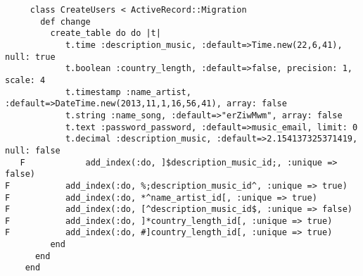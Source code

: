 	\begin{verbatim}
   	 class CreateUsers < ActiveRecord::Migration
	   def change
	     create_table do do |t|
			t.time :description_music, :default=>Time.new(22,6,41), null: true
   			t.boolean :country_length, :default=>false, precision: 1, scale: 4
   			t.timestamp :name_artist, :default=>DateTime.new(2013,11,1,16,56,41), array: false
   			t.string :name_song, :default=>"erZiwMwm", array: false
   			t.text :password_password, :default=>music_email, limit: 0
   			t.decimal :description_music, :default=>2.154137325371419, null: false
   F			add_index(:do, ]$description_music_id;, :unique => false)
F			add_index(:do, %;description_music_id^, :unique => true)
F			add_index(:do, *^name_artist_id[, :unique => true)
F			add_index(:do, [^description_music_id$, :unique => false)
F			add_index(:do, ]*country_length_id[, :unique => true)
F			add_index(:do, #]country_length_id[, :unique => true)
	     end
	  end 
    end
    \end{verbatim}

